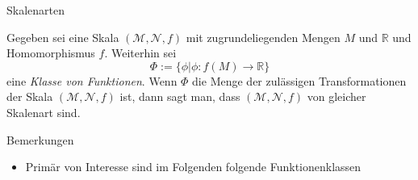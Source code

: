 \documentclass[
  8pt,
  ignorenonframetext,
]{beamer}
\begin{document}
\begin{frame}{Skalenarten}
\protect\hypertarget{skalenarten}{}
\footnotesize
\begin{definition}[Skalenart]
\justifying
Gegeben sei eine Skala $(\mathcal{M},\mathcal{N},f)$ mit zugrundeliegenden Mengen
$M$ und $\mathbb{R}$ und Homomorphismus $f$. Weiterhin sei 
\begin{equation}
\Phi := \{\phi| \phi : f(M) \to \mathbb{R} \}
\end{equation}
eine \textit{Klasse von Funktionen}. Wenn $\Phi$ die Menge der zulässigen Transformationen 
der Skala $(\mathcal{M},\mathcal{N},f)$ ist, dann sagt man, dass  $(\mathcal{M},\mathcal{N},f)$ 
von gleicher Skalenart sind.
\end{definition}

Bemerkungen

\begin{itemize}
\item Primär von Interesse sind im Folgenden folgende Funktionenklassen
\begin{itemize}
\end{itemize}
\end{itemize}
\end{frame}
\end{document}
